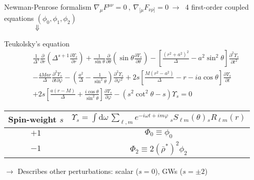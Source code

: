 \documentclass[9pt]{beamer}
\newcommand{\xDownarrow}[1]{%
	{\left\Downarrow\vbox to #1{}\right.\kern-\nulldelimiterspace}
}
\newcommand{\dd}{\mathrm{d}}
\begin{document}
\begin{frame}[fragile]{Newman-Penrose formalism}
	$\nabla_\mu F^{\mu\nu} = 0 ~,~ \nabla_{[\mu} F_{\nu\rho]} = 0  ~\longrightarrow~$ 4 first-order coupled equations $(\phi_0, \phi_1, \phi_2)$ \\
	$\hspace{1.5cm}\xDownarrow{0.25cm}$
	\begin{alertblock}{Teukolsky's equation}
		\begin{align*}
		& \frac{1}{\Delta^s} \frac{\partial}{\partial r} \left( \Delta^{s+1} \frac{\partial \Upsilon_s}{\partial r} \right) 
		+ \frac{1}{\sin\theta} \frac{\partial}{\partial\theta} \left( \sin\theta \frac{\partial \Upsilon_s}{\partial \theta} \right) 
		- \left[ \frac{(r^2+a^2)^2}{\Delta} - a^2 \sin^2\theta \right]\frac{\partial^2 \Upsilon_s}{\partial t^2} \\[0.15cm]
		& - \frac{4 M a r}{\Delta}\frac{\partial^2 \Upsilon_s}{\partial t \partial \varphi} 
		- \left( \frac{a^2}{\Delta} -\frac{1}{\sin^2\theta} \right)\frac{\partial^2 \Upsilon_s}{\partial \varphi^2} 
		+ 2s\left[ \frac{M(r^2-a^2)}{\Delta} - r - i a \cos\theta \right] \frac{\partial \Upsilon_s}{\partial t} \\[0.15cm]
		&+ 2s\left[ \frac{a(r-M)}{\Delta}+\frac{i \cos\theta}{\sin^2\theta}\right] \frac{\partial \Upsilon_s}{\partial \varphi}
		- (s^2 \cot^2\theta - s) \Upsilon_s = 0 
		\end{align*}
	\end{alertblock}
	
	\begin{center}
		\tabulinesep=0.5mm
		\begin{tabu}{|@{\hskip 0.25cm}c@{\hskip 0.25cm}|c@{\hskip 0.25cm}|}
			\hline
			Spin-weight $s$ & $\Upsilon_s = \int\dd\omega \,\sum_{\ell,m} e^{-i\omega t + i m \varphi} \, {}_{s}S_{\ell m}(\theta) {}_{s}R_{\ell m}(r) $ \\
			\hline\hline
			$+1$ & $\Phi_0 \equiv \phi_0$ \\
			\hline
			$-1$ & $\Phi_2 \equiv 2 (\bar{\rho}^*)^2 \phi_2$ \\
			\hline
		\end{tabu}
	\end{center}
	$\rightarrow$ Describes other perturbations: scalar ($s=0$), GWs ($s=\pm 2$)  
	
\end{frame}
\end{document}
